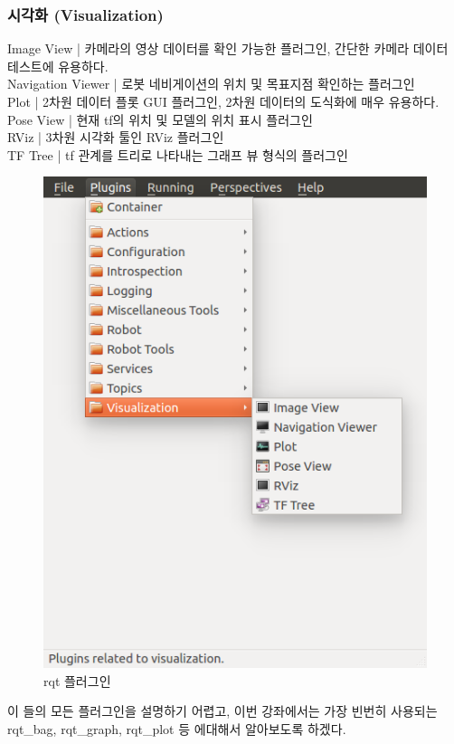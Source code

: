 \subsubsection{시각화 (Visualization)}
Image View | 카메라의 영상 데이터를 확인 가능한 플러그인, 간단한 카메라 데이터 테스트에 유용하다.\\
Navigation Viewer | 로봇 네비게이션의 위치 및 목표지점 확인하는 플러그인\\
Plot | 2차원 데이터 플롯 GUI 플러그인, 2차원 데이터의 도식화에 매우 유용하다.\\
Pose View | 현재 tf의 위치 및 모델의 위치 표시 플러그인\\
RViz | 3차원 시각화 툴인 RViz 플러그인\\
TF Tree | tf 관계를 트리로 나타내는 그래프 뷰 형식의 플러그인\\

\begin{figure}[h]
\centering\includegraphics[width=0.8\columnwidth]{pictures/chapter6/rqt_plugin.png}
\caption{rqt 플러그인}
\end{figure}

\vspace{\baselineskip}
\noindent
이 들의 모든 플러그인을 설명하기 어렵고, 이번 강좌에서는 가장 빈번히 사용되는 rqt\_bag, rqt\_graph, rqt\_plot 등 에대해서 알아보도록 하겠다.

